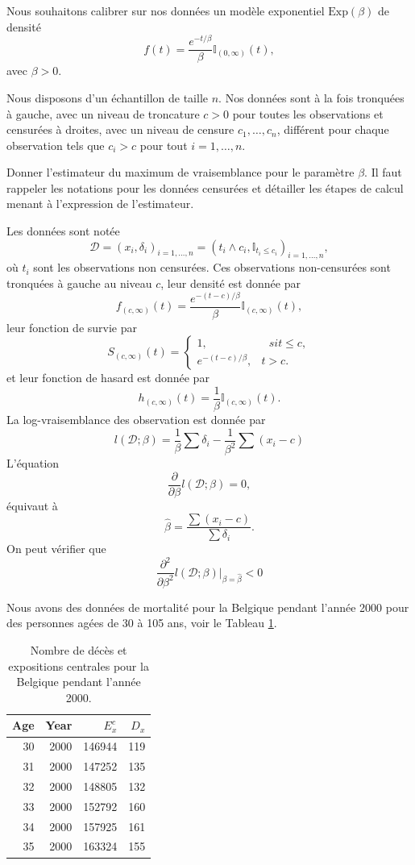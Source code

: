\documentclass[11pt, addpoints, answers]{exam}
\begin{document}
\begin{questions}
\question[4] Nous souhaitons calibrer sur nos données un modèle exponentiel $\text{Exp}(\beta)$ de densité
$$
f(t) = \frac{e^{-t/\beta}}{\beta}\mathbb{I}_{(0,\infty)}(t),
$$
avec $\beta>0$. 

Nous disposons d'un échantillon de taille $n$. Nos données sont à la fois tronquées à gauche, avec un niveau de troncature $c>0$ pour toutes les observations et censurées à droites, avec un niveau de censure $c_1, \ldots, c_n$, différent pour chaque observation tels que $c_i >c$ pour tout $i=1,\ldots, n$. 

Donner l'estimateur du maximum de vraisemblance pour le paramètre $\beta$. Il faut rappeler les notations pour les données censurées et détailler les étapes de calcul menant à l'expression de l'estimateur.
\begin{solution}
Les données sont notée 
$$
\mathcal{D} = (x_i,\delta_i)_{i = 1,\ldots, n} = (t_i\land c_i,\mathbb{I}_{t_i\leq c_i})_{i = 1,\ldots, n},
$$
où $t_i$ sont les observations non censurées. Ces observations non-censurées sont tronquées à gauche au niveau $c$, leur densité est donnée par 
$$
f_{(c,\infty)}(t) = \frac{e^{-(t-c)/\beta}}{\beta}\mathbb{I}_{(c,\infty)}(t),
$$
leur fonction de survie par 
$$
S_{(c,\infty)}(t) = \begin{cases}
1,&\text{ }si t\leq c,\\
e^{-(t-c)/\beta},& t>c.
\end{cases}
$$
et leur fonction de hasard est donnée par
$$
h_{(c,\infty)}(t) = \frac{1}{\beta}\mathbb{I}_{(c,\infty)}(t).
$$
La log-vraisemblance des observation est donnée par 
$$
l(\mathcal{D};\beta) = \frac{1}{\beta}\sum \delta_i - \frac{1}{\beta^2}\sum (x_i - c)
$$
L'équation 
$$
\frac{\partial }{\partial \beta}l(\mathcal{D};\beta) = 0,
$$
équivaut à 
$$
\hat{\beta} = \frac{\sum(x_i - c)}{\sum\delta_i}.
$$
On peut vérifier que 
$$
\frac{\partial^2 }{\partial \beta^2}l(\mathcal{D};\beta)\Big\rvert_{\beta = \hat{\beta}}  < 0
$$

\end{solution} 
\question Nous avons des données de mortalité pour la Belgique pendant l'année 2000 pour des personnes agées de 30 à 105 ans, voir le Tableau \ref{tab:death_count_belgium}.
\begin{table}[!ht]
\centering
\begin{tabular}{rrrr}
Age & Year & $E_x^c$ &$ D_x$ \\ 
  \hline
30 & 2000 & 146944 & 119 \\ 
  31 & 2000 & 147252 & 135 \\ 
  32 & 2000 & 148805 & 132 \\ 
  33 & 2000 & 152792 & 160 \\ 
  34 & 2000 & 157925 & 161 \\ 
  35 & 2000 & 163324 & 155 \\ 
   \hline
\end{tabular}
\caption{Nombre de décès et expositions centrales pour la Belgique pendant l'année 2000.}
\label{tab:death_count_belgium}
\end{table}
\begin{parts}

\end{parts}
\end{questions}
\end{document}
